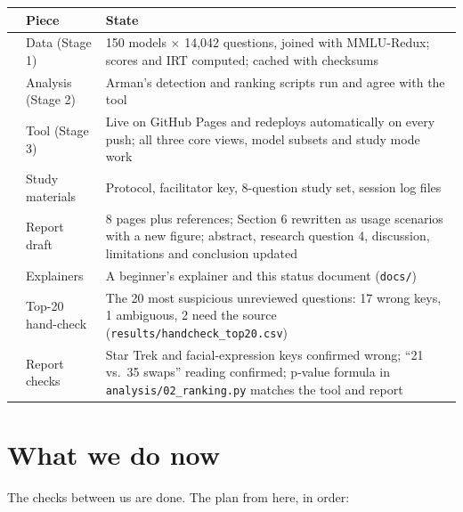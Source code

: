\documentclass[11pt]{article}
\newcommand{\done}{\textcolor{donec}{\checkmark}}
\begin{document}
\begin{center}\small
\begin{tabularx}{\linewidth}{@{}p{0.4cm}p{3.4cm}Y@{}}
\toprule
& \textbf{Piece} & \textbf{State} \\
\midrule
\done & Data (Stage 1) & 150 models $\times$ 14,042 questions, joined with MMLU-Redux; scores and
IRT computed; cached with checksums \\
\done & Analysis (Stage 2) & Arman's detection and ranking scripts run and agree with the tool \\
\done & Tool (Stage 3) & Live on GitHub Pages and redeploys automatically on every push; all three
core views, model subsets and study mode work \\
\done & Study materials & Protocol, facilitator key, 8-question study set, session log files \\
\done & Report draft & 8 pages plus references; Section 6 rewritten as usage scenarios with a new
figure; abstract, research question 4, discussion, limitations and conclusion updated \\
\done & Explainers & A beginner's explainer and this status document (\texttt{docs/}) \\
\done & Top-20 hand-check & The 20 most suspicious unreviewed questions: 17 wrong keys, 1 ambiguous,
2 need the source (\texttt{results/handcheck\_top20.csv}) \\
\done & Report checks & Star Trek and facial-expression keys confirmed wrong; ``21 vs.\ 35 swaps''
reading confirmed; p-value formula in \texttt{analysis/02\_ranking.py} matches the tool and report \\
\bottomrule
\end{tabularx}
\end{center}

\section{What we do now}

The checks between us are done. The plan from here, in order:
\end{document}
